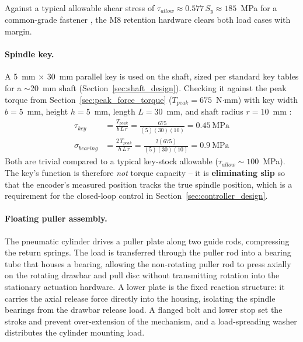 \documentclass[12pt,a4paper]{report}
\begin{document}
	\noindent Against a typical allowable shear stress of
	$\tau_{allow} \approx 0.577\,S_y \approx 185$~MPa for a common-grade fastener \cite{ref1},
	the M8 retention hardware clears both load cases with margin.
	
	\paragraph{Spindle key.} A 5~mm $\times$ 30~mm parallel key is used on the shaft, sized per
	standard key tables for a $\sim$20~mm shaft (Section~\ref{sec:shaft_design}). Checking it
	against the peak torque from Section~\ref{sec:peak_force_torque} ($T_{peak} = 675$~N$\cdot$mm)
	with key width $b=5$~mm, height $h=5$~mm, length $L=30$~mm, and shaft radius $r=10$~mm \cite{ref1}:
	\begin{align}
		\tau_{key} &= \frac{T_{peak}}{b\,L\,r} = \frac{675}{(5)(30)(10)} = 0.45~\text{MPa} \\
		\sigma_{bearing} &= \frac{2\,T_{peak}}{h\,L\,r} = \frac{2(675)}{(5)(30)(10)} = 0.9~\text{MPa}
	\end{align}
	Both are trivial compared to a typical key-stock allowable ($\tau_{allow} \sim 100$~MPa).
	The key's function is therefore \emph{not} torque capacity -- it is
	\textbf{eliminating slip} so that the encoder's measured position tracks the true spindle
	position, which is a requirement for the closed-loop control in Section~\ref{sec:controller_design}.
	
	\paragraph{Floating puller assembly.} The pneumatic cylinder drives a puller plate along two
	guide rods, compressing the return springs. The load is transferred through the puller rod
	into a bearing tube that houses a bearing, allowing the non-rotating puller rod to press
	axially on the rotating drawbar and pull disc without transmitting rotation into the
	stationary actuation hardware. A lower plate is the fixed reaction structure: it carries the
	axial release force directly into the housing, isolating the spindle bearings from the
	drawbar release load. A flanged bolt and lower stop set the stroke and prevent
	over-extension of the mechanism, and a load-spreading washer distributes the cylinder
	mounting load.
	

	
\end{document}
